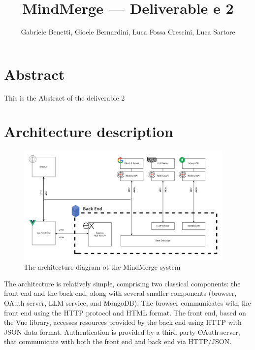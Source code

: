 \documentclass{article}
\title{MindMerge --- Deliverable e 2}
\author{Gabriele Benetti, Gioele Bernardini, Luca Fossa Crescini, Luca Sartore}
\begin{document}
\maketitle


\tableofcontents


\newpage
\section*{Abstract}   %
This is the Abstract of the deliverable 2

\section{Architecture description}


\begin{figure}[h]
  \centering
  \includegraphics[width=0.95\textwidth]{images/architecture.jpg}
  \caption{\small The architecture diagram ot the MindMerge system}
\end{figure}
The architecture is relatively simple,
comprising two classical components: the front end and the back end, along with several smaller components (browser, OAuth server, LLM service, and MongoDB).
\newline \newline
The browser communicates with the front end using the HTTP protocol and HTML format.
\newline \newline
The front end, based on the Vue library, accesses resources provided by the back end using HTTP with JSON data format.
\newline \newline
Authentication is provided by a third-party OAuth server, that communicate with both the front end and back end via HTTP/JSON.
\newline \newline
\end{document}
